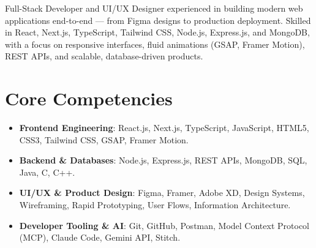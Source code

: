 \documentclass[11pt,a4paper,sans]{moderncv}
\begin{document}
\makecvtitle


\vspace{6pt}
\small{Full-Stack Developer and UI/UX Designer experienced in building modern web applications end-to-end --- from Figma designs to production deployment. Skilled in React, Next.js, TypeScript, Tailwind CSS, Node.js, Express.js, and MongoDB, with a focus on responsive interfaces, fluid animations (GSAP, Framer Motion), REST APIs, and scalable, database-driven products.}


\section{Core Competencies}
\vspace{1pt}
\begin{itemize}

\item \textbf{Frontend Engineering}: React.js, Next.js, TypeScript, JavaScript, HTML5, CSS3, Tailwind CSS, GSAP, Framer Motion.

\item \textbf{Backend \& Databases}: Node.js, Express.js, REST APIs, MongoDB, SQL, Java, C, C++.

\item \textbf{UI/UX \& Product Design}: Figma, Framer, Adobe XD, Design Systems, Wireframing, Rapid Prototyping, User Flows, Information Architecture.

\item \textbf{Developer Tooling \& AI}: Git, GitHub, Postman, Model Context Protocol (MCP), Claude Code, Gemini API, Stitch.

\end{itemize}

\end{document}
